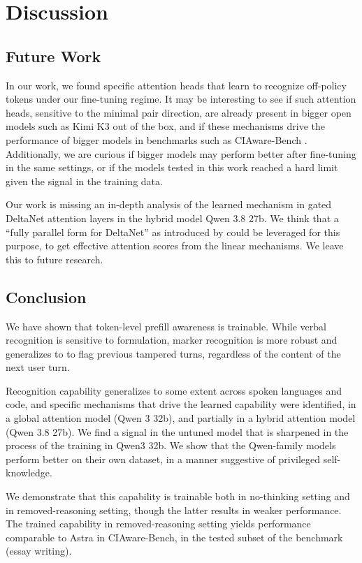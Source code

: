 \section{Discussion}
\label{sec:discussion}

\subsection{Future Work}
\label{sec:future-work}
In our work, we found specific attention heads that learn to recognize off-policy tokens under our fine-tuning regime. It may be interesting to see if such attention heads, sensitive to the minimal pair direction, are already present in bigger open models such as Kimi K3 out of the box, and if these mechanisms drive the performance of bigger models in benchmarks such as CIAware-Bench \citep{schaeffer2026ciaware}. Additionally, we are curious if bigger models may perform better after fine-tuning in the same settings, or if the models tested in this work reached a hard limit given the signal in the training data.

Our work is missing an in-depth analysis of the learned mechanism in gated DeltaNet attention layers in the hybrid model Qwen 3.8 27b. We think that a ``fully parallel form for DeltaNet'' as introduced by \citet{yang2024deltanet} could be leveraged for this purpose, to get effective attention scores from the linear mechanisms. We leave this to future research.

\subsection{Conclusion}
\label{sec:conclusion}
We have shown that token-level prefill awareness is trainable. While verbal recognition is sensitive to formulation, marker recognition is more robust and generalizes to to flag previous tampered turns, regardless of the content of the next user turn.

Recognition capability generalizes to some extent across spoken languages and code, and specific mechanisms that drive the learned capability were identified, in a global attention model (Qwen 3 32b), and partially in a hybrid attention model (Qwen 3.8 27b). We find a signal in the untuned model that is sharpened in the process of the training in Qwen3 32b. We show that the Qwen-family models perform better on their own dataset, in a manner suggestive of privileged self-knowledge.

We demonstrate that this capability is trainable both in no-thinking setting and in removed-reasoning setting, though the latter results in weaker performance. The trained capability in removed-reasoning setting yields performance comparable to Astra in CIAware-Bench, in the tested subset of the benchmark (essay writing).
